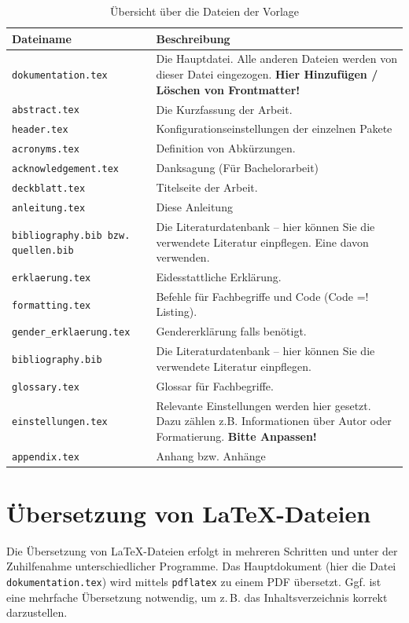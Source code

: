 \begin{table}[h!]
    \centering
    \begin{tabularx}{\textwidth}{lX}
        \textbf{Dateiname} & \textbf{Beschreibung} \\\toprule
        \texttt{dokumentation.tex} & Die Hauptdatei. Alle anderen Dateien werden von dieser Datei eingezogen. \textbf{Hier Hinzufügen / Löschen von Frontmatter!} \\
        \texttt{abstract.tex} & Die Kurzfassung der Arbeit. \\    
        \texttt{header.tex} & Konfigurationseinstellungen der einzelnen Pakete \\
        \texttt{acronyms.tex} & Definition von Abkürzungen. \\
        \texttt{acknowledgement.tex} & Danksagung (Für Bachelorarbeit) \\
        \texttt{deckblatt.tex} & Titelseite der Arbeit. \\
        \texttt{anleitung.tex} & Diese Anleitung \\ 
        \texttt{bibliography.bib bzw. quellen.bib} & Die Literaturdatenbank -- hier können Sie die verwendete Literatur einpflegen. Eine davon verwenden.\\
        \texttt{erklaerung.tex} & Eidesstattliche Erklärung.\\
        \texttt{formatting.tex} & Befehle für Fachbegriffe und Code (Code =! Listing). \\
        \texttt{gender\_erklaerung.tex} & Gendererklärung falls benötigt. \\
        \texttt{bibliography.bib} & Die Literaturdatenbank -- hier können Sie die verwendete Literatur einpflegen.\\
        \texttt{glossary.tex} & Glossar für Fachbegriffe. \\
        \texttt{einstellungen.tex} & Relevante Einstellungen werden hier gesetzt. Dazu zählen z.B. Informationen über Autor oder Formatierung. \textbf{Bitte Anpassen!} \\
        \texttt{appendix.tex} & Anhang bzw. Anhänge \\\bottomrule
    \end{tabularx}
    \caption{\label{tab:dateien}Übersicht über die Dateien der Vorlage}
\end{table}


\section{Übersetzung von \LaTeX-Dateien}
Die Übersetzung von \LaTeX-Dateien erfolgt in mehreren Schritten und unter der Zuhilfenahme unterschiedlicher Programme. Das Hauptdokument (hier die Datei \texttt{dokumentation.tex}) wird mittels \texttt{pdflatex} zu einem PDF übersetzt. Ggf. ist eine mehrfache Übersetzung notwendig, um z.\,B. das Inhaltsverzeichnis korrekt darzustellen. 

